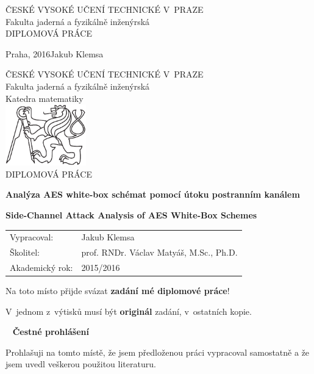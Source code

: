 \documentclass[11pt,a4paper,twoside,openright]{report}
\theoremstyle{definition}
\theoremstyle{remark}
\newcommand{\cvut}{ČESKÉ VYSOKÉ UČENÍ TECHNICKÉ V~PRAZE}
\newcommand{\fjfi}{Fakulta jaderná a fyzikálně inženýrská}
\newcommand{\km}{Katedra matematiky}
\newcommand{\TYPPRACE}{DIPLOMOVÁ PRÁCE}
\newcommand{\mePrace}{mé diplomové práce}
\newcommand{\nazevcz}{Analýza AES white-box schémat pomocí útoku postranním kanálem}
\newcommand{\nazeven}{Side-Channel Attack Analysis of AES White-Box Schemes}
\newcommand{\autor}{Jakub Klemsa}
\newcommand{\vedouci}{prof. RNDr. Václav Matyáš, M.Sc., Ph.D.}
\newcommand{\rok}{2016}
\newcommand{\akadRok}{2015/2016}
\newcommand{\misto}{Praha}
\begin{document}
\begin{titlepage}
	
	\thispagestyle{empty}
	\begin{center}
		{\Large \cvut \\[12pt] \fjfi \\[260pt]}
		{\Huge \TYPPRACE}
	\end{center}
	\vfill
	{
		\Large \misto, \rok \hfill \autor
	}
	\cleardoublepage
	
	
	\thispagestyle{empty}
	\begin{center}
		{\Large \cvut \\[10pt] \fjfi \\[10pt] \km \\[40pt]}
		\includegraphics[height=75pt]{lev.pdf} \\[100pt]
		
		{\LARGE \TYPPRACE \\[60pt]}
		
		{\Large\bf \nazevcz \\[30pt]}
		
		{\Large\bf \nazeven}
	\end{center}
	\vfill
	{
		\Large
		\begin{tabular}{ll}
		Vypracoval: & \autor\\[3pt]
		Školitel: & \vedouci\\[3pt]
		Akademický rok: & \akadRok
		\end{tabular}
	}
	\cleardoublepage
	
	
	\thispagestyle{empty}
	\Large
	Na toto místo přijde svázat \textbf{zadání \mePrace}!
	
	\vspace{4mm}
	V~jednom z~výtisků musí být \textbf{originál} zadání, v~ostatních kopie.
	\normalsize
	\cleardoublepage
	
	
	\thispagestyle{empty}
	~
	\vfill
	\noindent\textbf{Čestné prohlášení}
	\vspace{0.5cm}
	
	\noindent
	Prohlašuji na tomto místě, že jsem předloženou práci vypracoval samostatně a že jsem uvedl veškerou použitou literaturu.
	\vspace{1.5cm}
	

\end{titlepage}
\end{document}
